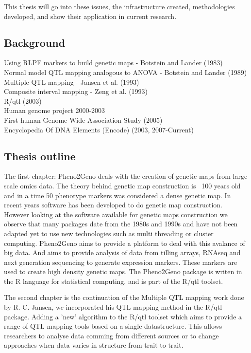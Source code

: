 This thesis will go into these issues, the infrastructure created, methodologies developed, and 
show their application in current research.

\subsection{Background}

Using RLPF markers to build genetic maps - Botstein and Lander (1983)\\
Normal model QTL mapping analogous to ANOVA - Botstein and Lander (1989)\\
Multiple QTL mapping - Jansen et al. (1993)\\
Composite interval mapping -  Zeng et al. (1993)\\
R/qtl (2003)\\
Human genome project 2000-2003\\
First human Genome Wide Association Study (2005)\\
Encyclopedia Of DNA Elements (Encode) (2003, 2007-Current)


\subsection{Thesis outline}

The first chapter: Pheno2Geno deals with the creation of genetic maps from large scale omics data. 
The theory behind genetic map construction is ~100 years old and in a time 50 phenotype markers was 
considered a dense genetic map. In recent years software has been developed to do genetic map 
construction. However looking at the software available for genetic maps construction we observe 
that many packages date from the 1980s and 1990s and have not been adapted yet to use new 
technologies such as multi threading or cluster computing. Pheno2Geno aims to provide a platform to 
deal with this avalance of big data. And aims to provide analysis of data from tilling arrays, 
RNAseq and next generation sequencing to generate expression markers. These markers are used to 
create high density genetic maps. The Pheno2Geno package is writen in the R language for statistical 
computing, and is part of the R/qtl toolset.

The second chapter is the continuation of the Multiple QTL mapping work done by R. C. Jansen, we 
incorporated his QTL mapping method in the R/qtl package. Adding a 'new' algorithm to the R/qtl 
toolset which aims to provide a range of QTL mapping tools based on a single datastructure. 
This allows researchers to analyse data comming from different sources or to change approaches when 
data varies in structure from trait to trait.

